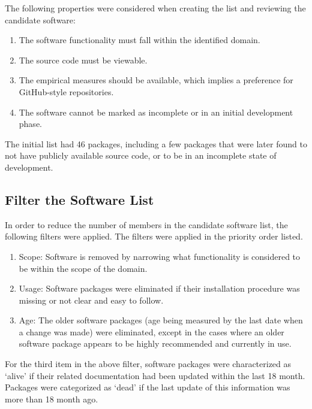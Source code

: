 \documentclass[12pt, notitlepage]{article}
\begin{document}
The following properties were considered when creating the list and reviewing the candidate software:

\begin{enumerate}
	\item The software functionality must fall within the identified domain.
	\item The source code must be viewable.
	\item The empirical measures should be available, which implies a preference for GitHub-style repositories.
	\item The software cannot be marked as incomplete or in an initial development phase.
\end{enumerate}

The initial list had 46 packages, including a few packages that were later found to not have publicly available source code, or to be in an incomplete state of development. 

\subsection{Filter the Software List}\label{filtersoftware}

In order to reduce the number of members in the candidate software list, the following filters were applied. The filters were applied in the priority order listed.

\begin{enumerate}
	\item Scope: Software is removed by narrowing what functionality is considered to be within the scope of the domain.
	\item Usage: Software packages were eliminated if their installation procedure was missing or not clear and easy to follow.
	\item Age: The older software packages (age being measured by the last date when a change was made) were eliminated, except in the cases where an older software package appears to be highly recommended and currently in use. 
\end{enumerate}

For the third item in the above filter, software packages were characterized as `alive' if their related documentation had been updated within
the last 18 month. Packages were categorized as `dead' if the last update of this information was more than 18 month ago.\\ 
\end{document}
